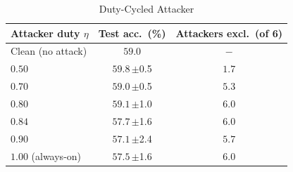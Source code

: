 \begin{table}[!t]\centering\footnotesize
\caption{Duty-Cycled Attacker}
\label{tab:duty}
\setlength{\tabcolsep}{6pt}
\begin{tabular}{@{}lcc@{}}\toprule
Attacker duty $\eta$ & Test acc.\ (\%) & Attackers excl.\ (of 6)\\\midrule
Clean (no attack) & $59.0$ & $-$\\
$0.50$ & $59.8$\,{\scriptsize$\pm$0.5} & $1.7$\\
$0.70$ & $59.0$\,{\scriptsize$\pm$0.5} & $5.3$\\
$0.80$ & $59.1$\,{\scriptsize$\pm$1.0} & $6.0$\\
$0.84$ & $57.7$\,{\scriptsize$\pm$1.6} & $6.0$\\
$0.90$ & $57.1$\,{\scriptsize$\pm$2.4} & $5.7$\\
$1.00$ (always-on) & $57.5$\,{\scriptsize$\pm$1.6} & $6.0$\\
\bottomrule\end{tabular}
\end{table}
